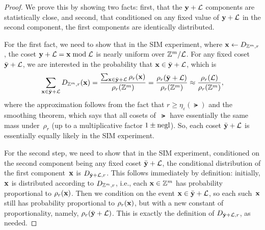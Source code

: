 \documentclass[11pt]{article}
\begin{document}
\begin{proof}
  We prove this by showing two facts: first, that the $\mathbf{y}+\mathcal{L}$
  components are statistically close, and second, that conditioned on
  any fixed value of $\mathbf{y}+\mathcal{L}$ in the second component, the first
  components are identically distributed.

  For the first fact, we need to show that in the SIM
  experiment, where $\mathbf{x} \gets D_{\mathbb{Z}^{m},r}$, the coset
  $\mathbf{y}+\mathcal{L} = \mathbf{x} \bmod \mathcal{L}$ is nearly uniform over
  $\mathbb{Z}^{m}/\mathcal{L}$. For any fixed coset $\bar{\mathbf{y}}+\mathcal{L}$, we are
  interested in the probability that $\mathbf{x} \in \bar{\mathbf{y}}+\mathcal{L}$,
  which is
  \[ \sum_{\mathbf{x} \in \bar{\mathbf{y}}+\mathcal{L}} D_{\mathbb{Z}^{m},r}(\mathbf{x}) =
    \frac{\sum_{\mathbf{x} \in \bar{\mathbf{y}}+\mathcal{L}}
      \rho_{r}(\mathbf{x})}{\rho_{r}(\mathbb{Z}^{m})} =
    \frac{\rho_{r}(\bar{\mathbf{y}}+\mathcal{L})}{\rho_{r}(\mathbb{Z}^{m})} \approx
    \frac{\rho_{r}(\mathcal{L})}{\rho_{r}(\mathbb{Z}^{m})}, \] where the
  approximation follows from the fact that
  $r \geq \eta_{\varepsilon}(\lat)$ and the smoothing theorem, which
  says that all cosets of~$\lat$ have essentially the same mass
  under~$\rho_{r}$ (up to a multiplicative factor $1 \pm \operatorname{negl}$). So,
  each coset $\bar{\mathbf{y}}+\mathcal{L}$ is essentially equally likely in the
  SIM experiment.

  For the second step, we need to show that in the SIM
  experiment, conditioned on the second component being any fixed
  coset $\bar{\mathbf{y}}+\mathcal{L}$, the conditional distribution of the first
  component~$\mathbf{x}$ is $D_{\bar{\mathbf{y}}+\mathcal{L},r}$. This follows
  immediately by definition: initially, $\mathbf{x}$ is distributed
  according to $D_{\mathbb{Z}^{m},r}$, i.e., each $\mathbf{x} \in \mathbb{Z}^{m}$ has
  probability proportional to $\rho_{r}(\mathbf{x})$. Then we condition on
  the event $\mathbf{x} \in \bar{\mathbf{y}}+\mathcal{L}$, so each such~$\mathbf{x}$ still
  has probability proportional to $\rho_{r}(\mathbf{x})$, but with a new
  constant of proportionality, namely, $\rho_{r}(\bar{\mathbf{y}}+\mathcal{L})$.
  This is exactly the definition of $D_{\bar{\mathbf{y}}+\mathcal{L},r}$, as
  needed.
\end{proof}
\end{document}
